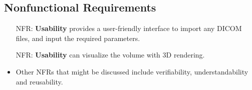 \documentclass[12pt]{article}
\newcounter{nfrnum} %
\begin{document}
\subsection{Nonfunctional Requirements}

\noindent \begin{itemize}


\item[NFR\refstepcounter{nfrnum}\thenfrnum \label{NFR_GUI}:] \textbf{Usability}
\progname{} provides a user-friendly interface to import any DICOM files, and input the required parameters.

\item[NFR\refstepcounter{nfrnum}\thenfrnum \label{NFR_visualize}:] \textbf{Usability}
\progname{} can visualize the volume with 3D rendering.

%

\item Other NFRs that might be discussed include verifiability,
  understandability and reusability.

\end{itemize}
\end{document}
